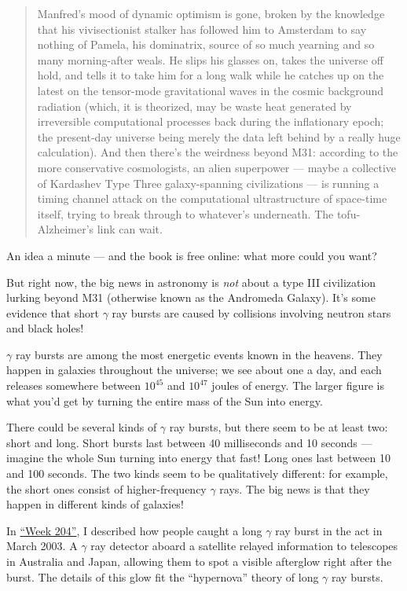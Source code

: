 \documentclass{article}
\begin{document}
\begin{quote}
Manfred's mood of dynamic optimism is gone, broken by the knowledge that
his vivisectionist stalker has followed him to Amsterdam to say nothing
of Pamela, his dominatrix, source of so much yearning and so many
morning-after weals. He slips his glasses on, takes the universe off
hold, and tells it to take him for a long walk while he catches up on
the latest on the tensor-mode gravitational waves in the cosmic
background radiation (which, it is theorized, may be waste heat
generated by irreversible computational processes back during the
inflationary epoch; the present-day universe being merely the data left
behind by a really huge calculation). And then there's the weirdness
beyond M31: according to the more conservative cosmologists, an alien
superpower --- maybe a collective of Kardashev Type Three
galaxy-spanning civilizations --- is running a timing channel attack on
the computational ultrastructure of space-time itself, trying to break
through to whatever's underneath. The tofu-Alzheimer's link can wait.
\end{quote}

An idea a minute --- and the book is free online: what more could you
want?

But right now, the big news in astronomy is \emph{not} about a type III
civilization lurking beyond M31 (otherwise known as the Andromeda
Galaxy). It's some evidence that short \(\gamma\) ray bursts are caused
by collisions involving neutron stars and black holes!

\(\gamma\) ray bursts are among the most energetic events known in the
heavens. They happen in galaxies throughout the universe; we see about
one a day, and each releases somewhere between \(10^{45}\) and
\(10^{47}\) joules of energy. The larger figure is what you'd get by
turning the entire mass of the Sun into energy.

There could be several kinds of \(\gamma\) ray bursts, but there seem to
be at least two: short and long. Short bursts last between 40
milliseconds and 10 seconds --- imagine the whole Sun turning into
energy that fast! Long ones last between 10 and 100 seconds. The two
kinds seem to be qualitatively different: for example, the short ones
consist of higher-frequency \(\gamma\) rays. The big news is that they
happen in different kinds of galaxies!

In \protect\hyperlink{week204}{``Week 204''}, I described how people
caught a long \(\gamma\) ray burst in the act in March 2003. A
\(\gamma\) ray detector aboard a satellite relayed information to
telescopes in Australia and Japan, allowing them to spot a visible
afterglow right after the burst. The details of this glow fit the
``hypernova'' theory of long \(\gamma\) ray bursts.
\end{document}
